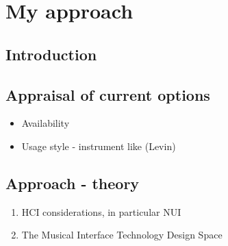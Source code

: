 \documentclass[a4paper,12pt]{article}
\begin{document}
\section{My approach}
\label{sec:org234a3e0}
\subsection{Introduction}
\label{sec:orgf8dcfea}
\subsection{Appraisal of current options}
\label{sec:org147952e}
\begin{itemize}
\item Availability
\item Usage style - instrument like (Levin)
\end{itemize}
\subsection{Approach - theory}
\label{sec:orgcca6374}
\begin{enumerate}
\item HCI considerations, in particular NUI \cite{wigdor_brave_2011}
\item The Musical Interface Technology Design Space \cite{overholt_musical_2009}
\end{enumerate}
\end{document}
